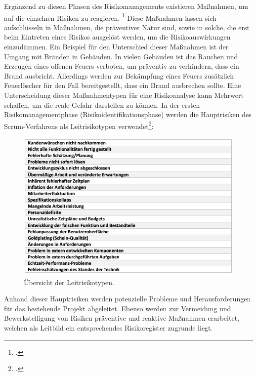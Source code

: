 Ergänzend zu diesen Phasen des Risikomanagements existieren Maßnahmen, um auf die einzelnen Risiken zu reagieren.
\footcite[Vgl.][S. 22 f.]{brandstaeterAgileITProjekteErfolgreich2013}
Diese Maßnahmen lassen sich aufschlüsseln in Maßnahmen, die präventiver Natur sind, sowie in solche, die erst beim Eintreten
eines Risikos ausgelöst werden, um die Risikoauswirkungen einzudämmen.
Ein Beispiel für den Unterschied dieser Maßnahmen ist der Umgang mit Bränden in Gebäuden.
In vielen Gebäuden ist das Rauchen und Erzeugen eines offenen Feuers verboten, um präventiv zu verhindern, dass ein Brand ausbricht.
Allerdings werden zur Bekämpfung eines Feuers zusätzlich Feuerlöscher für den Fall bereitgestellt, dass ein Brand ausbrechen sollte.
Eine Unterscheidung dieser Maßnahmentypen für eine Risikoanalyse kann Mehrwert schaffen, um die reale Gefahr darstellen zu können.
In der ersten Risikomanagementphase (Risikoidentifikationsphase) werden die Hauptrisiken des Scrum-Verfahrens
als Leitrisikotypen verwendet\footcite[Vgl.][40]{brandstaeterAgileITProjekteErfolgreich2013}: 
\begin{figure}[H]
    \centering
    \includegraphics[width=1\linewidth]{graphics/leitrisiko.png}
    \caption{Übersicht der Leitrisikotypen.}\label{abb:zeitplanung}
\end{figure}
Anhand dieser Hauptrisiken werden potenzielle Probleme und Herausforderungen für das bestehende Projekt abgeleitet.
Ebenso werden zur Vermeidung und Bewerkstelligung von Risiken präventive und reaktive Maßnahmen erarbeitet, welchen
als Leitbild ein entsprechendes Risikoregister zugrunde liegt.
